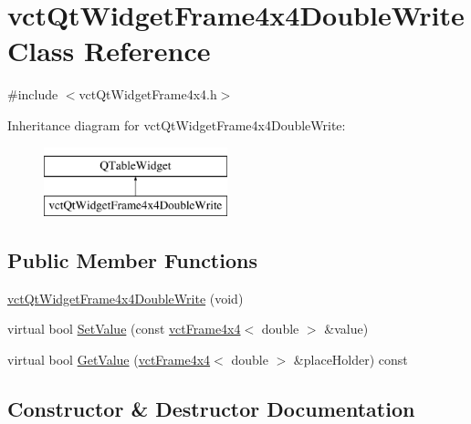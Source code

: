 \hypertarget{classvct_qt_widget_frame4x4_double_write}{}\section{vct\+Qt\+Widget\+Frame4x4\+Double\+Write Class Reference}
\label{classvct_qt_widget_frame4x4_double_write}


{\ttfamily \#include $<$vct\+Qt\+Widget\+Frame4x4.\+h$>$}

Inheritance diagram for vct\+Qt\+Widget\+Frame4x4\+Double\+Write\+:\begin{figure}[H]
\begin{center}
\leavevmode
\includegraphics[height=2.000000cm]{d7/d9b/classvct_qt_widget_frame4x4_double_write}
\end{center}
\end{figure}
\subsection*{Public Member Functions}
\begin{DoxyCompactItemize}
\item 
\hyperlink{classvct_qt_widget_frame4x4_double_write_af2807cbb7dff6e3786d41415f880319c}{vct\+Qt\+Widget\+Frame4x4\+Double\+Write} (void)
\item 
virtual bool \hyperlink{classvct_qt_widget_frame4x4_double_write_abe883560c80fe6f99548f4adc03f6f44}{Set\+Value} (const \hyperlink{classvct_frame4x4}{vct\+Frame4x4}$<$ double $>$ \&value)
\item 
virtual bool \hyperlink{classvct_qt_widget_frame4x4_double_write_a7b57b901948a465567693591530a6673}{Get\+Value} (\hyperlink{classvct_frame4x4}{vct\+Frame4x4}$<$ double $>$ \&place\+Holder) const 
\end{DoxyCompactItemize}


\subsection{Constructor \& Destructor Documentation}
\hypertarget{classvct_qt_widget_frame4x4_double_write_af2807cbb7dff6e3786d41415f880319c}{}
